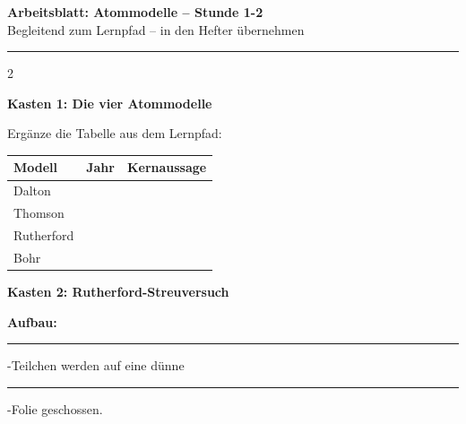 \documentclass[10pt, a4paper]{article}
\newcommand{\fachfarbe}{physik}
\newcommand{\thema}{Atommodelle}
\newcommand{\stunde}{Stunde 1-2}
\newcommand{\luecke}[1]{\rule{#1}{0.4pt}}
\newcommand{\abschnitt}[1]{%
    \vspace{8pt}
    \noindent\textbf{\textcolor{\fachfarbe}{#1}}
    \vspace{4pt}
}
\begin{document}

\begin{center}
{\large\bfseries Arbeitsblatt: \thema{} -- \stunde}\\[2pt]
{\small\textcolor{grau}{Begleitend zum Lernpfad -- in den Hefter übernehmen}}
\end{center}

\vspace{-2pt}
\hrule
\vspace{8pt}


\begin{multicols}{2}
\small


\abschnitt{Kasten 1: Die vier Atommodelle}

\begin{merksatz}
Ergänze die Tabelle aus dem Lernpfad:

\vspace{6pt}

\renewcommand{\arraystretch}{1.8}
\begin{tabular}{|p{1.8cm}|p{0.8cm}|p{3.5cm}|}
\hline
\textbf{Modell} & \textbf{Jahr} & \textbf{Kernaussage} \\
\hline
Dalton & & \\
\hline
Thomson & & \\
\hline
Rutherford & & \\
\hline
Bohr & & \\
\hline
\end{tabular}
\renewcommand{\arraystretch}{1}
\end{merksatz}

\vspace{6pt}


\abschnitt{Kasten 2: Rutherford-Streuversuch}

\begin{merksatz}
\textbf{Aufbau:}\\
\luecke{2cm}-Teilchen werden auf eine dünne\\
\luecke{2cm}-Folie geschossen.


\end{merksatz}
\end{multicols}
\end{document}
